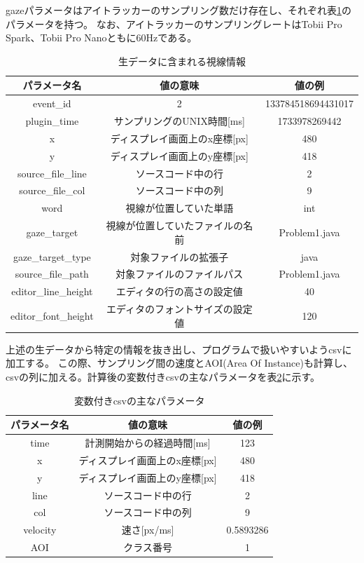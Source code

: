 \documentclass[paper=a4paper,fontsize=11pt]{jlreq}
\begin{document}
  gazeパラメータはアイトラッカーのサンプリング数だけ存在し、それぞれ表\ref{gaze_data}のパラメータを持つ。
  なお、アイトラッカーのサンプリングレートはTobii Pro Spark、Tobii Pro Nanoともに60Hzである。

  \begin{table}[h]
    \centering
    \caption{生データに含まれる視線情報}
    \begin{tabular}{|c|c|c|}
        \hline
        パラメータ名 & 値の意味 & 値の例 \\ \hline
        event\_id & 2 & 133784518694431017 \\ \hline
        plugin\_time & サンプリングのUNIX時間[ms] & 1733978269442 \\ \hline
        x & ディスプレイ画面上のx座標[px] & 480 \\ \hline
        y & ディスプレイ画面上のy座標[px] & 418 \\ \hline
        source\_file\_line & ソースコード中の行 & 2 \\ \hline
        source\_file\_col & ソースコード中の列 & 9 \\ \hline
        word & 視線が位置していた単語 & int \\ \hline
        gaze\_target & 視線が位置していたファイルの名前 & Problem1.java \\ \hline
        gaze\_target\_type & 対象ファイルの拡張子 & java \\ \hline
        source\_file\_path & 対象ファイルのファイルパス & Problem1.java \\ \hline
        editor\_line\_height & エディタの行の高さの設定値 & 40 \\ \hline
        editor\_font\_height & エディタのフォントサイズの設定値 & 120 \\ \hline
    \end{tabular}
    \label{gaze_data}
  \end{table}
  \FloatBarrier
  
  上述の生データから特定の情報を抜き出し、プログラムで扱いやすいようcsvに加工する。
  この際、サンプリング間の速度とAOI(Area Of Instance)も計算し、csvの列に加える。計算後の変数付きcsvの主なパラメータを表\ref{csv_data}に示す。
  \begin{table}[h]
    \centering
    \caption{変数付きcsvの主なパラメータ}
    \begin{tabular}{|c|c|c|}
        \hline
        パラメータ名 & 値の意味 & 値の例 \\ \hline
        time & 計測開始からの経過時間[ms] & 123 \\ \hline
        x & ディスプレイ画面上のx座標[px] & 480 \\ \hline
        y & ディスプレイ画面上のy座標[px] & 418 \\ \hline
        line & ソースコード中の行 & 2 \\ \hline
        col & ソースコード中の列 & 9 \\ \hline
        velocity & 速さ[px/ms] & 0.5893286\\ \hline
        AOI & クラス番号 & 1\\ \hline
    \end{tabular}
    \label{csv_data}
  \end{table}
  \FloatBarrier
\end{document}
